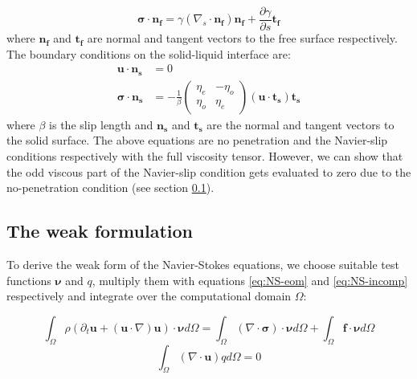 \documentclass[%
 amsmath,amssymb,
 aps,
10.5pt]{revtex4-2}
\begin{document}
\begin{equation} \label{eq:bc_free}
    \boldsymbol{\sigma} \cdot \boldsymbol{n_f} = \gamma (\nabla_s \cdot \boldsymbol{n_f}) \boldsymbol{n_f} + \frac{\partial \gamma}{\partial s} \boldsymbol{t_f}
\end{equation}
where $\boldsymbol{n_f}$ and $\boldsymbol{t_f}$ are normal and tangent vectors to the free surface respectively. The boundary conditions on the solid-liquid interface are:
{
\begin{align}
    \boldsymbol{u}\cdot \boldsymbol{n_s} &= 0 \nonumber\\ 
    \boldsymbol{\sigma \cdot n_s} &= -\frac{1}{\beta} \begin{pmatrix} \eta_e & -\eta_o \\ \eta_o & \eta_e \end{pmatrix} (\boldsymbol{u} \cdot \boldsymbol{t_s}) \boldsymbol{t_s}  \label{eq:bc_solid} 
\end{align}
where $\beta$ is the slip length} and $\boldsymbol{n_s}$ and $\boldsymbol{t_s}$ are the normal and tangent vectors to the solid surface. The above equations are no penetration and the Navier-slip conditions respectively with the full viscosity tensor. However, we can show that the odd viscous part of the Navier-slip condition gets evaluated to zero due to the no-penetration condition (see section \ref{sec:weak_formulation}). 

\subsection{The weak formulation} \label{sec:weak_formulation}
To derive the weak form of the Navier-Stokes equations, we choose suitable test functions $\boldsymbol{\nu}$ and $q$, multiply them with equations \ref{eq:NS-eom} and \ref{eq:NS-incomp} respectively and integrate over the computational domain $\Omega$: 

\begin{equation} \label{eq:wf_1}
    \int_\Omega \rho \left(\partial_t \boldsymbol{u} + (\boldsymbol{u}\cdot\nabla)\boldsymbol{u} \right)\cdot \boldsymbol{\nu} d\Omega = \int_\Omega (\nabla \cdot \boldsymbol{\sigma}) \cdot \boldsymbol{\nu} d\Omega + \int_\Omega \boldsymbol{f} \cdot \boldsymbol{\nu} d\Omega
\end{equation}
\begin{equation}\label{eq:wf_2}
    \int_\Omega (\nabla \cdot \boldsymbol{u}) q d\Omega = 0
\end{equation}
\end{document}
